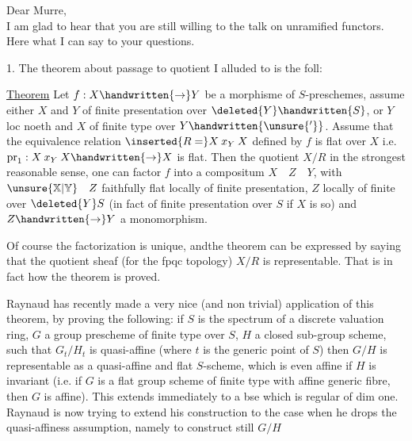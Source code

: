 Dear Murre,\\

I am glad to hear that you are still willing to  the talk on unramified functors. Here what I can say to your questions.

1. The theorem about passage to quotient I alluded to is the foll:

\uline{Theorem} Let $f:X\handwritten{\to}Y$ be a morphisme of $S$-preschemes, assume either $X$ and $Y$  of finite presentation over $\deleted{Y}\handwritten{S}$, or $Y$ loc noeth and $X$  of finite type over $Y\handwritten{\unsure{'}}$. Assume that the equivalence relation $\inserted{R=}X\mathbin{x}_{Y}X$ defined by $f$ is flat over $X$ i.e. $\mathrm{pr}_{1}:X\mathbin{x}_{Y}X\handwritten{\to}X$ is flat. Then the quotient $X/R$  in the strongest reasonable sense,  one can factor $f$ into a compositum $X\quad Z\quad Y$, with $\unsure{\mathbb{X}|\mathbb{Y}}\quad Z$ faithfully flat locally of finite presentation, $Z$ locally of finite  over $\deleted{Y}S$ (in fact of finite presentation over $S$ if $X$ is so) and $Z\handwritten{\to}Y$ a monomorphism.

Of course the factorization is unique, andthe theorem can be expressed by saying that the quotient sheaf (for the fpqc topology) $X/R$ is representable. That is in fact how the theorem is proved.

Raynaud has recently made a very nice (and non trivial) application of this theorem, by proving the following: if $S$ is the spectrum of a discrete valuation ring, $G$ a group prescheme of finite type over $S$, $H$ a closed  sub-group scheme, such that $G_{t}/H_{t}$ is  quasi-affine (where $t$ is the generic point of $S$) then $G/H$ is representable as a quasi-affine and flat $S$-scheme, which is even affine if $H$ is invariant (i.e. if $G$ is a flat group scheme of finite type with affine generic fibre, then $G$ is affine). This extends immediately to a bse which is regular of dim one. Raynaud is now trying to extend his construction to the case when he drops the quasi-affiness assumption, namely to construct still $G/H$
